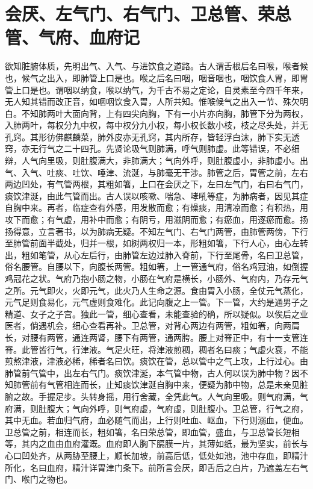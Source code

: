 \documentclass[a4paper,12pt,UTF8,twoside]{ctexbook}
\begin{document}
	\chapter{会厌、左气门、右气门、卫总管、荣总管、气府、血府记}
	欲知脏腑体质，先明出气、入气、与进饮食之道路。古人谓舌根后名曰喉，喉者候也，候气之出入，即肺管上口是也。喉之后名曰咽，咽音咽也，咽饮食人胃，即胃管上口是也。谓咽以纳食，喉以纳气，为千古不易之定论，自灵素至今四千年来，无人知其错而改正音，如咽咽饮食入胃，人所共知。惟喉候气之出入一节、殊欠明白。不知肺两叶大面向背，上有四尖向胸，下有一小片亦向胸，肺管下分为两权，入肺两叶，每权分九中权，每中权分九小权，每小权长数小枝，枝之尽头处，并无孔窍。其形彷佛麒麟菜，肺外皮亦无孔窍，其内所存，皆轻浮白沫，肺下实无透窍，亦无行气之二十四孔。先贤论吸气则肺满，呼气则肺虚。此等错误，不必细辩，人气向里吸，则肚腹满大，非肺满大；气向外呼，则肚腹虚小，非肺虚小。出气、入气、吐痰、吐饮、唾津、流涎，与肺毫无干涉。肺管之后，胃管之前，左右两边凹处，有气管两根，其粗如箸，上口在会厌之下，左曰左气门，右曰右气门，痰饮津涎，由此气管而出。古人误以咳嗽、喘急、哮吼等症，为肺病者，因见其症自胸中来。再者，临症查有外感，用发散而愈；有燥痰，用清凉而愈；有积热，用攻下而愈；有气虚，用补中而愈；有阴亏，用滋阴而愈；有瘀血，用逐瘀而愈。扬扬得意，立言著书，以为肺病无疑。不知左气门、右气门两管，由肺管两傍，下行至肺管前面半截处，归并一根，如树两权归一本，形粗如箸，下行人心，由心左转出，粗如笔管，从心左后行，由肺管左边过肺入脊前，下行至尾骨，名曰卫总管，俗名腰管。自腰以下，向腹长两管。粗如箸，上一管通气府，俗名鸡冠油，如倒握鸡冠花之状。气府乃抱小肠之物，小肠在气府是横长，小肠外、气府内，乃存元气之所。元气即火，火即元气，此火乃人生命之源。食由胃入小肠，全仗元气蒸化，元气足则食易化，元气虚则食难化。此记向腹之上一管。下一管，大约是通男子之精道、女子之子宫。独此一管，细心查看，未能查验的确，所以疑似。以俟后之业医者，倘遇机会，细心查看再补。卫总管，对背心两边有两管，粗如箸，向两肩长，对腰有两管，通连两肾，腰下有两管，通两胯。腰上对脊正中，有十一支管连脊。此管皆行气，行津液。气足火旺，将津液煎稠，稠者名曰痰；气虚火衰，不能煎熬津液，津液必稀，稀者名曰饮。痰饮在管，总以管中之气上攻，上行过心。由肺管前气管中，出左右气门。痰饮津涎，本气管中物，古人何以误为肺中物？因不知肺管前有气管相连而长，止知痰饮津涎自胸中来，便疑为肺中物，总是未亲见脏腑之故。手握足步。头转身摇，用行舍藏，全凭此气。人气向里吸。则气府满，气府满，则肚腹大；气向外呼，则气府虚，气府虚，则肚腹小。卫总管，行气之府，其中无血。若血归气府，血必随气而出，上行则吐血、岖血，下行则溺血，便血。卫总管之前，相连而长，粗如箸，名曰荣总管，即血管，盛血，与卫总管长短相等，其内之血由血府灌溉。血府即人胸下膈膜一片，其薄如纸，最为坚实，前长与心口凹处齐，从两胁至腰上，顺长加坡，前高后低，低处如池，池中存血，即精汁所化，名曰血府，精汁详胃津门条下。前所言会厌，即舌后之白片，乃遮盖左右气门、喉门之物也。
	
\end{document}

